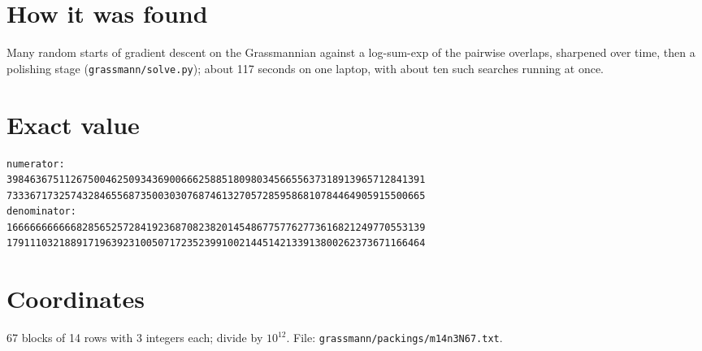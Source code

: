 \documentclass[11pt,a4paper]{article}
\begin{document}
\section{How it was found}
Many random starts of gradient descent on the Grassmannian against a log-sum-exp of the pairwise overlaps, sharpened over time, then a polishing stage (\texttt{grassmann/solve.py}); about 117 seconds on one laptop, with about ten such searches running at once.


\appendix
\section{Exact value}
{\small
\begin{verbatim}
numerator:
398463675112675004625093436900666258851809803456655637318913965712841391
733367173257432846556873500303076874613270572859586810784464905915500665
denominator:
166666666666828565257284192368708238201454867757762773616821249770553139
179111032188917196392310050717235239910021445142133913800262373671166464
\end{verbatim}}

\section{Coordinates}
67 blocks of 14 rows with 3 integers each; divide by $10^{12}$. File: \texttt{grassmann/packings/m14n3N67.txt}.
{\tiny
\begin{multicols}{3}
\end{multicols}}
\end{document}
